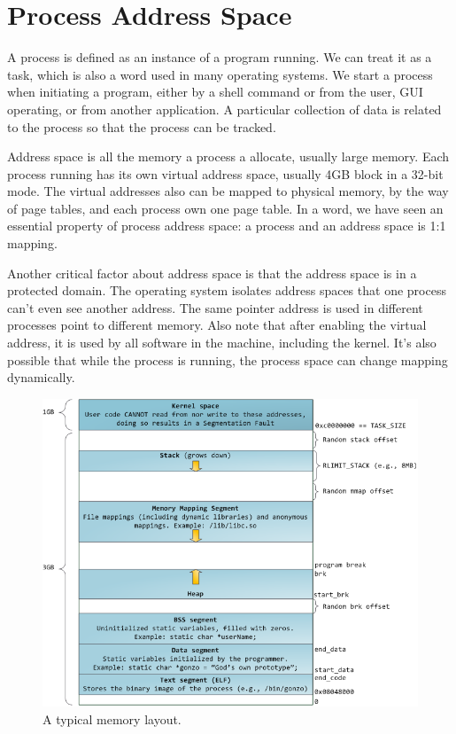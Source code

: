 \documentclass[doc,natbib,12pt]{apa6}
\begin{document}
	
	
	
	
	
	
	
	
	\newpage
	\section{Process Address Space} \label{chp:processAddressSpace}
	
	A process is defined as an instance of a program running. We can treat it as a task, which is also a word used in many operating systems. We start a process when initiating a program, either by a shell command or from the user, GUI operating, or from another application. A particular collection of data is related to the process so that the process can be tracked. 
	
	Address space is all the memory a process a allocate, usually large memory. Each process running has its own virtual address space, usually 4GB block in a 32-bit mode. The virtual addresses also can be mapped to physical memory, by the way of page tables, and each process own one page table. In a word, we have seen an essential property of process address space: a process and an address space is 1:1 mapping.
	
	Another critical factor about address space is that the address space is in a protected domain. The operating system isolates address spaces that one process can't even see another address. The same pointer address is used in different processes point to different memory. Also note that after enabling the virtual address, it is used by all software in the machine, including the kernel. It's also possible that while the process is running, the process space can change mapping dynamically.
	
	\begin{figure}[h]
		\centering
		\includegraphics[width=1\textwidth]{linuxFlexibleAddressSpaceLayout.png}
		\caption{\label{fig:memoryLayout}A typical memory layout. \citep{Duarte2009}}
	\end{figure}
	
\end{document}
